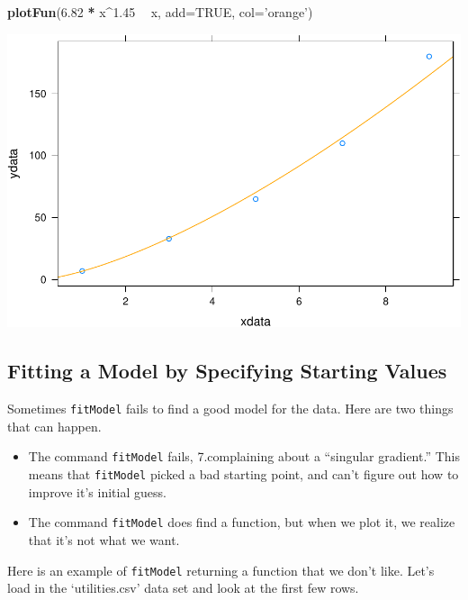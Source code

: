 \documentclass[
]{book}
\newenvironment{Shaded}{\begin{snugshade}}{\end{snugshade}}
\newcommand{\DataTypeTok}[1]{\textcolor[rgb]{0.13,0.29,0.53}{#1}}
\newcommand{\FloatTok}[1]{\textcolor[rgb]{0.00,0.00,0.81}{#1}}
\newcommand{\KeywordTok}[1]{\textcolor[rgb]{0.13,0.29,0.53}{\textbf{#1}}}
\newcommand{\NormalTok}[1]{#1}
\newcommand{\OperatorTok}[1]{\textcolor[rgb]{0.81,0.36,0.00}{\textbf{#1}}}
\newcommand{\OtherTok}[1]{\textcolor[rgb]{0.56,0.35,0.01}{#1}}
\newcommand{\StringTok}[1]{\textcolor[rgb]{0.31,0.60,0.02}{#1}}
\providecommand{\tightlist}{%
  \setlength{\itemsep}{0pt}\setlength{\parskip}{0pt}}
\begin{document}
\begin{Shaded}
\begin{Highlighting}[]
\KeywordTok{plotFun}\NormalTok{(}\FloatTok{6.82} \OperatorTok{*}\StringTok{ }\NormalTok{x}\OperatorTok{^}\FloatTok{1.45} \OperatorTok{~}\StringTok{ }\NormalTok{x, }\DataTypeTok{add=}\OtherTok{TRUE}\NormalTok{, }\DataTypeTok{col=}\StringTok{'orange'}\NormalTok{)}
\end{Highlighting}
\end{Shaded}

\includegraphics{_bookdown_files/math135_handbook_files/figure-latex/unnamed-chunk-38-2.pdf}

\hypertarget{fitting-a-model-by-specifying-starting-values}{%
\subsection{Fitting a Model by Specifying Starting Values}\label{fitting-a-model-by-specifying-starting-values}}

Sometimes \texttt{fitModel} fails to find a good model for the data. Here are two things that can happen.

\begin{itemize}
\tightlist
\item
  The command \texttt{fitModel} fails, 7.complaining about a ``singular gradient.'' This means that \texttt{fitModel} picked a bad starting point, and can't figure out how to improve it's initial guess.
\item
  The command \texttt{fitModel} does find a function, but when we plot it, we realize that it's not what we want.
\end{itemize}

Here is an example of \texttt{fitModel} returning a function that we don't like. Let's load in the `utilities.csv' data set and look at the first few rows.
\end{document}
